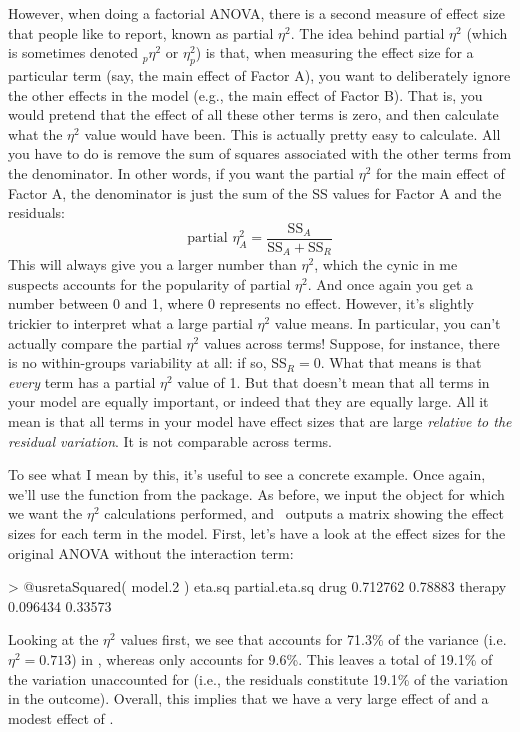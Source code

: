 However, when doing a factorial ANOVA, there is a second measure of effect size that people like to report, known as partial $\eta^2$. The idea behind partial $\eta^2$ (which is sometimes denoted $_p\eta^2$ or $\eta^2_p$) is that, when measuring the effect size for a particular term (say, the main effect of Factor A), you want to deliberately ignore the other effects in the model (e.g., the main effect of Factor B). That is, you would pretend that the effect of all these other terms is zero, and then calculate what the $\eta^2$ value would have been. This is actually pretty easy to calculate. All you have to do is remove the sum of squares associated with the other terms from the denominator. In other words, if you want the partial $\eta^2$ for the main effect of Factor A, the denominator is just the sum of the SS values for Factor A and the residuals:
$$
\mbox{partial } \eta^2_A = \frac{\mbox{SS}_{A}}{\mbox{SS}_{A} + \mbox{SS}_{R}}
$$
This will always give you a larger number than $\eta^2$, which the cynic in me suspects accounts for the popularity of partial $\eta^2$. And once again you get a number between 0 and 1, where 0 represents no effect. However, it's slightly trickier to interpret what a large partial $\eta^2$ value means. In particular, you can't actually compare the partial $\eta^2$ values across terms! Suppose, for instance, there is no within-groups variability at all: if so, SS$_R = 0$. What that means is that {\it every} term has a partial $\eta^2$ value of 1. But that doesn't mean that all terms in your model are equally important, or indeed that they are equally large. All it mean is that all terms in your model have effect sizes that are large {\it relative to the residual variation}. It is not comparable across terms.

To see what I mean by this, it's useful to see a concrete example. Once again, we'll use the  function from the  package. As before, we input the  object for which we want the $\eta^2$ calculations performed, and \R\ outputs a matrix showing the effect sizes for each term in the model. First, let's have a look at the effect sizes for the original ANOVA without the interaction term:
\begin{rblock1}
> @usr{etaSquared( model.2 )}
              eta.sq partial.eta.sq
drug        0.712762        0.78883
therapy     0.096434        0.33573
\end{rblock1}
Looking at the $\eta^2$ values first, we see that  accounts for 71.3\% of the variance (i.e. $\eta^2 = 0.713$) in , whereas  only accounts for 9.6\%. This leaves a total of 19.1\% of the variation unaccounted for (i.e., the residuals constitute 19.1\% of the variation in the outcome). Overall, this implies that we have a very large effect of  and a modest effect of . 

